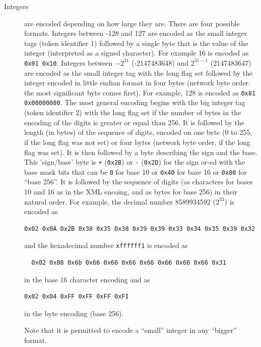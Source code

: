 \documentclass{report}
\def\textquote#1{``#1''}
\def\XML{XML\xspace}
\begin{document}
\begin{description}
\item[Integers] are encoded depending on how large they
      are. There are four possible formats.  Integers between -128 and 127 are
      encoded as the small integer tags (token
	identifier 1) followed by a single byte that is the 
      value of the integer (interpreted as a signed character). For
      example 16 is encoded as \lstinline|0x01 0x10|.  Integers between
      $-2^{31}$  (-2147483648) and $2^{31-1}$  (2147483647) are encoded as
      the small integer tag with the long flag set followed by the integer
      encoded in little endian format in four bytes (network byte order:
      the most significant byte comes first). For example, 128 is encoded
      as \lstinline|0x81| \lstinline|0x00000080|.  The most
      general encoding begins 
      with the big integer tag (token identifier 2) with the long flag set
      if the number of bytes in the encoding of the digits is greater or
      equal than 256. It is followed by the length (in bytes) of the
      sequence of digits, encoded on one byte (0 to 255, if the long flag
      was not set) or four bytes (network byte order, if the long flag was
      set).  It is then followed by a byte describing the sign and the
      base.  This 'sign/base' byte is \lstinline|+|
      (\lstinline|0x2B|) or \lstinline|-|
      (\lstinline|0x2D|) for the sign or-ed with the base mask bits
      that can be \lstinline|0| for base 10 
      or \lstinline|0x40| for base 16 or
	\lstinline|0x80| for \textquote{base 256}.  It is
      followed by the 
      sequence of digits (as 
      characters for bases 10 and 16 as in the \XML
	encoing, and as bytes for base 256) in their natural
      order.  For example, the decimal
	number 8589934592
      ($2^{33}$) is encoded  as
\begin{lstlisting}
0x02 0x0A 0x2B 0x38 0x35 0x38 0x39 0x39 0x33 0x34 0x35 0x39 0x32
\end{lstlisting}
      and the
      hexadecimal number
      \lstinline|xffffff1| is 
      encoded as 
\begin{lstlisting}
  0x02 0x08 0x6b 0x66 0x66 0x66 0x66 0x66 0x66 0x66 0x31
\end{lstlisting}
in the base 16 character encoding and as 
\begin{lstlisting}
0x02 0x04 0xFF 0xFF 0xFF 0xFI
\end{lstlisting}
in the byte encoding (base 256).

Note that it is permitted to encode a \textquote{small} integer in any \textquote{bigger}
format.


\end{description}
\end{document}
